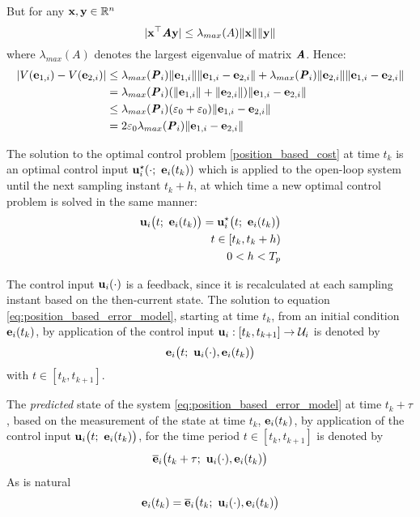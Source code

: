 \begin{bw_box}
\begin{lemma}
  But for any $\bm{\mathbf{x}}, \bm{\mathbf{y}} \in \mathbb{R}^n$
  $$|\bm{\mathbf{x}}^{\top} \bm{\mathit{A}} \bm{\mathbf{y}}| \leq \lambda_{max}(A) \|\bm{\mathbf{x}}\| \|\bm{\mathbf{y}}\|$$
  where $\lambda_{max}(A)$ denotes the largest eigenvalue of matrix $\bm{\mathit{A}}$.
  Hence:
  \begin{align}
    |V(\bm{\mathbf{e}}_{1,i}) - V(\bm{\mathbf{e}}_{2,i})| &\leq
    \lambda_{max}(\bm{\mathit{P}}_i) \|\bm{\mathbf{e}}_{1,i}\| \|\bm{\mathbf{e}}_{1,i} - \bm{\mathbf{e}}_{2,i}\| +
    \lambda_{max}(\bm{\mathit{P}}_i) \|\bm{\mathbf{e}}_{2,i}\| \|\bm{\mathbf{e}}_{1,i} - \bm{\mathbf{e}}_{2,i}\| \\
    &= \lambda_{max}(\bm{\mathit{P}}_i) (\|\bm{\mathbf{e}}_{1,i}\| + \|\bm{\mathbf{e}}_{2,i}\|)\|\bm{\mathbf{e}}_{1,i} - \bm{\mathbf{e}}_{2,i}\| \\
    & \leq \lambda_{max}(\bm{\mathit{P}}_i) (\varepsilon_0 + \varepsilon_0)\|\bm{\mathbf{e}}_{1,i} - \bm{\mathbf{e}}_{2,i}\| \\
    &= 2 \varepsilon_0 \lambda_{max}(\bm{\mathit{P}}_i) \|\bm{\mathbf{e}}_{1,i} - \bm{\mathbf{e}}_{2,i}\|
  \end{align}
  \qedsymbol
\label{lemma:V_Lipschitz_e_0}
\end{lemma}
\end{bw_box}


The solution to the optimal control problem \eqref{position_based_cost}
at time $t_k$ is an optimal control input
$\bm{\mathbf{u}}_i^{\star}(\cdot;\ \bm{\mathbf{e}}_i(t_k))$ which
is applied to the open-loop system until the next sampling instant $t_k + h$,
at which time a new optimal control problem is solved in the same manner:
\begin{align}
  \vect{u}_i\big(t;\ \vect{e}_i(t_k)\big) = \vect{u}_i^{\star}\big(t;\ \vect{e}_i(t_k)\big) \label{eq:position_based_optimal_u} \\
  t \in [t_k, t_k + h) \nonumber \\
  0 < h < T_p \nonumber
\end{align}

The control input $\bm{\mathbf{u}}_i(\cdot)$ is a feedback, since it is
recalculated at each sampling instant based on the then-current state. The
solution to equation \eqref{eq:position_based_error_model}, starting at time
$t_k$, from an initial condition $\bm{\mathbf{e}}_i(t_k)$, by application of the
control input $\bm{\mathbf{u}}_i : [t_k, t_{k+1}] \to \mathcal{U}_i$ is denoted by
$$\bm{\mathbf{e}}_i\big(t;\ \bm{\mathbf{u}}_i(\cdot), \bm{\mathbf{e}}_i(t_k)\big)$$
with $t \in [t_k, t_{k+1}]$.

The \textit{predicted} state of the system \eqref{eq:position_based_error_model}
at time $t_k + \tau$, based on the measurement of the state at time
$t_k$, $\bm{\mathbf{e}}_i(t_k)$, by application of the control input
$\vect{u}_i\big(t;\ \vect{e}_i(t_k)\big)$, for the time period $t \in [t_k, t_{k+1}]$
is denoted by
\begin{align}
  \overline{\bm{\mathbf{e}}}_i\big(t_k + \tau;\ \bm{\mathbf{u}}_i(\cdot), \bm{\mathbf{e}}_i(t_k)\big) \label{eq:position_based_predicted_error_0}
\end{align}
As is natural
\begin{align}
  \bm{\mathbf{e}}_i(t_k) = \overline{\bm{\mathbf{e}}}_i\big(t_k;\ \bm{\mathbf{u}}_i(\cdot), \bm{\mathbf{e}}_i(t_k)\big)
  \label{eq:error_now_to_predicted_error}
\end{align}

